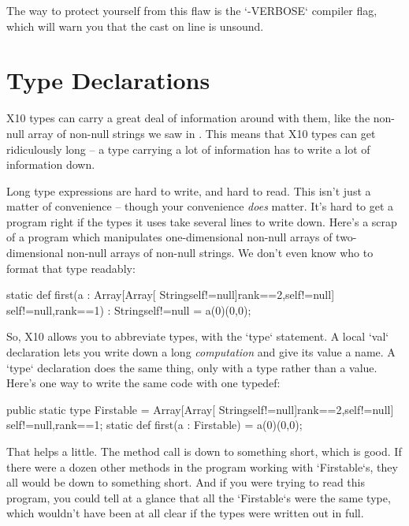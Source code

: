 The way to protect yourself from this flaw is the \xcd`-VERBOSE` compiler
flag, which will warn you that the cast on line  is unsound.  




\section{Type Declarations}
\label{sect:TypeDecl}

X10 types can carry a great deal of information around with them, like the
non-null array of non-null strings we saw in .
This means that X10 types can get ridiculously long -- a type carrying a lot
of information has to write a lot of information down.  

Long type expressions are hard to write, and hard to read.  This isn't just a
matter of convenience -- though your convenience {\em does} matter.  It's hard
to get a program right if the types it uses take several lines to write down.
Here's a scrap of a program which manipulates one-dimensional non-null arrays
of two-dimensional non-null arrays of non-null strings.  We don't even know
who to format that type readably: 
\begin{xtennum}[]
static def first(a : Array[Array[
       String{self!=null}]{rank==2,self!=null}]
       {self!=null,rank==1})
 : String{self!=null} = a(0)(0,0); 
\end{xtennum}

So, X10 allows you to abbreviate types, with the \xcd`type` statement.
A local \xcd`val` declaration lets you write down a long {\em computation} and
give its value a name.  A \xcd`type` declaration does the same thing, only
with a type rather than a value.  Here's one way to write the same code 
with one typedef: 
\begin{xtennum}[]
public static type Firstable = Array[Array[
   String{self!=null}]{rank==2,self!=null}]
   {self!=null,rank==1};
static def first(a : Firstable) = a(0)(0,0);
\end{xtennum}

That helps a little.  The method call is down to something short, which is
good.  If there were a dozen other methods in the program working with
\xcd`Firstable`s, they all would be down to something short.  And if you were
trying to read this program, you could tell at a glance that all the
\xcd`Firstable`s were the same type, which wouldn't have been at all clear if
the types were written out in full.

